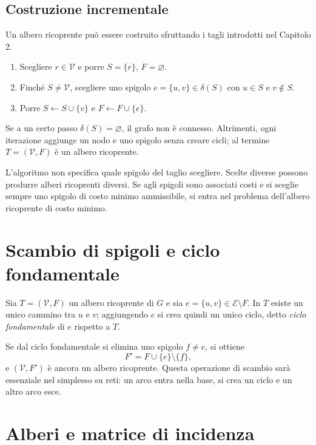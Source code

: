 \documentclass[11pt,a4paper]{article}
\newcommand{\V}{\mathcal{V}}
\newcommand{\E}{\mathcal{E}}
\begin{document}
\subsection{Costruzione incrementale}

Un albero ricoprente può essere costruito sfruttando i tagli introdotti nel Capitolo 2.

\begin{enumerate}
\item Scegliere $r\in\V$ e porre $S=\{r\}$, $F=\varnothing$.
\item Finché $S\neq\V$, scegliere uno spigolo $e=\{u,v\}\in\delta(S)$ con $u\in S$ e $v\notin S$.
\item Porre $S\leftarrow S\cup\{v\}$ e $F\leftarrow F\cup\{e\}$.
\end{enumerate}

Se a un certo passo $\delta(S)=\varnothing$, il grafo non è connesso. Altrimenti, ogni iterazione aggiunge un nodo e uno spigolo senza creare cicli; al termine $T=(\V,F)$ è un albero ricoprente.

\begin{warningbox}
L'algoritmo non specifica quale spigolo del taglio scegliere. Scelte diverse possono produrre alberi ricoprenti diversi. Se agli spigoli sono associati costi e si sceglie sempre uno spigolo di costo minimo ammissibile, si entra nel problema dell'albero ricoprente di costo minimo.
\end{warningbox}

\section{Scambio di spigoli e ciclo fondamentale}

Sia $T=(\V,F)$ un albero ricoprente di $G$ e sia $e=\{u,v\}\in\E\setminus F$. In $T$ esiste un unico cammino tra $u$ e $v$; aggiungendo $e$ si crea quindi un unico ciclo, detto \emph{ciclo fondamentale} di $e$ rispetto a $T$.

Se dal ciclo fondamentale si elimina uno spigolo $f\neq e$, si ottiene
\[
F'=F\cup\{e\}\setminus\{f\},
\]
e $(\V,F')$ è ancora un albero ricoprente. Questa operazione di scambio sarà essenziale nel simplesso su reti: un arco entra nella base, si crea un ciclo e un altro arco esce.

\section{Alberi e matrice di incidenza}
\end{document}
